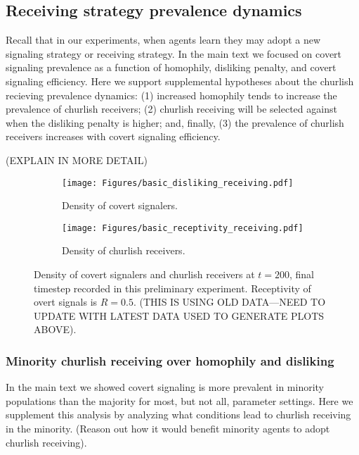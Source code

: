\documentclass[11pt,letterpaper]{article}
\begin{document}
\subsection{Receiving strategy prevalence dynamics}

Recall that in our experiments, when agents learn they may adopt a new signaling 
strategy or receiving strategy.  In the main text we focused on covert 
signaling prevalence as a function of homophily, disliking penalty, and 
covert signaling efficiency. Here we support supplemental hypotheses about
the churlish recieving prevalence dynamics: (1) increased homophily tends
to increase the prevalence of churlish receivers; (2) churlish receiving
will be selected against when the disliking penalty is higher; and,
finally, (3) the prevalence of churlish receivers increases with 
covert signaling efficiency. 

(EXPLAIN IN MORE DETAIL)

\begin{figure}[H]
  \centering
  \begin{subfigure}{0.49\textwidth}
    \centering
    \texttt{[image: Figures/basic\_disliking\_receiving.pdf]}
    \caption{Density of covert signalers.}
  \end{subfigure}
  \begin{subfigure}{0.49\textwidth}
    \centering
    \texttt{[image: Figures/basic\_receptivity\_receiving.pdf]}
    \caption{Density of churlish receivers.}
  \end{subfigure}
  
  \caption{Density of covert signalers and churlish receivers at $t=200$, 
    final timestep recorded in this preliminary experiment. Receptivity of
    overt signals is $R=0.5$. (THIS IS USING OLD DATA---NEED TO UPDATE WITH
    LATEST DATA USED TO GENERATE PLOTS ABOVE).}
  \label{fig:receptivityHomophilyHeatmap}
\end{figure}

\subsubsection{Minority churlish receiving over homophily and disliking}

In the main text we showed covert signaling is more prevalent in minority 
populations than the majority for most, but not all, parameter settings. 
Here we supplement this analysis by analyzing what conditions lead to
churlish receiving in the minority. (Reason out how it would benefit minority
agents to adopt churlish receiving).
\end{document}

